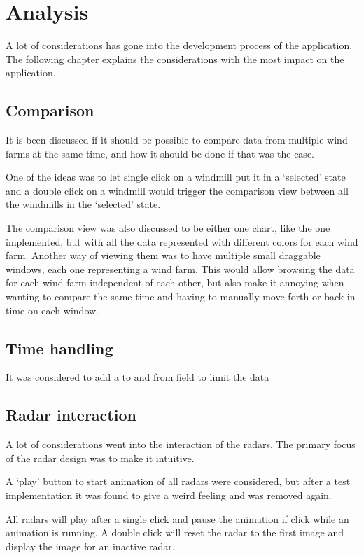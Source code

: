 \chapter{Analysis}
\label{sec:analysis}
A lot of considerations has gone into the development process of the application. The following chapter explains the considerations with the most impact on the application.

\section{Comparison}
It is been discussed if it should be possible to compare data from multiple wind farms at the same time, and how it should be done if that was the case.

One of the ideas was to let single click on a windmill put it in a `selected' state and a double click on a windmill would trigger the comparison view between all the windmills in the `selected' state.

The comparison view was also discussed to be either one chart, like the one implemented, but with all the data represented with different colors for each wind farm.
Another way of viewing them was to have multiple small draggable windows, each one representing a wind farm. This would allow browsing the data for each wind farm independent of each other, but also make it annoying when wanting to compare the same time and having to manually move forth or back in time on each window.

\section{Time handling}
It was considered to add a to and from field to limit the data

\section{Radar interaction}
A lot of considerations went into the interaction of the radars. The primary focus of the radar design was to make it intuitive.

A `play' button to start animation of all radars were considered, but after a test implementation it was found to give a weird feeling and was removed again.

All radars will play after a single click and pause the animation if click while an animation is running. A double click will reset the radar to the first image and display the image for an inactive radar.

